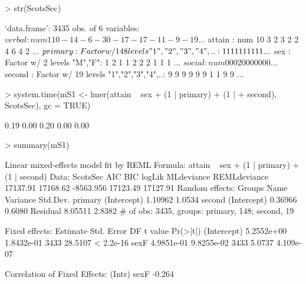 \documentclass[12pt]{article}
\begin{document}
\begin{Schunk}
\begin{Sinput}
> str(ScotsSec)
\end{Sinput}
\begin{Soutput}
`data.frame':	3435 obs. of  6 variables:
 $ verbal : num  11 0 -14 -6 -30 -17 -17 -11 -9 -19 ...
 $ attain : num  10 3 2 3 2 2 4 6 4 2 ...
 $ primary: Factor w/ 148 levels "1","2","3","4",..: 1 1 1 1 1 1 1 1 1 1 ...
 $ sex    : Factor w/ 2 levels "M","F": 1 2 1 1 2 2 2 1 1 1 ...
 $ social : num  0 0 0 20 0 0 0 0 0 0 ...
 $ second : Factor w/ 19 levels "1","2","3","4",..: 9 9 9 9 9 9 1 1 9 9 ...
\end{Soutput}
\begin{Sinput}
> system.time(mS1 <- lmer(attain ~ sex + (1 | primary) + (1 | 
+     second), ScotsSec), gc = TRUE)
\end{Sinput}
\begin{Soutput}
[1] 0.19 0.00 0.20 0.00 0.00
\end{Soutput}
\begin{Sinput}
> summary(mS1)
\end{Sinput}
\begin{Soutput}
Linear mixed-effects model fit by REML
Formula: attain ~ sex + (1 | primary) + (1 | second) 
   Data: ScotsSec 
      AIC      BIC    logLik MLdeviance REMLdeviance
 17137.91 17168.62 -8563.956   17123.49     17127.91
Random effects:
 Groups   Name        Variance Std.Dev.
 primary  (Intercept) 1.10962  1.0534  
 second   (Intercept) 0.36966  0.6080  
 Residual             8.05511  2.8382  
# of obs: 3435, groups: primary, 148; second, 19

Fixed effects:
              Estimate Std. Error   DF t value  Pr(>|t|)
(Intercept) 5.2552e+00 1.8432e-01 3433 28.5107 < 2.2e-16
sexF        4.9851e-01 9.8255e-02 3433  5.0737 4.109e-07

Correlation of Fixed Effects:
     (Intr)
sexF -0.264
\end{Soutput}
\end{Schunk}
\end{document}
